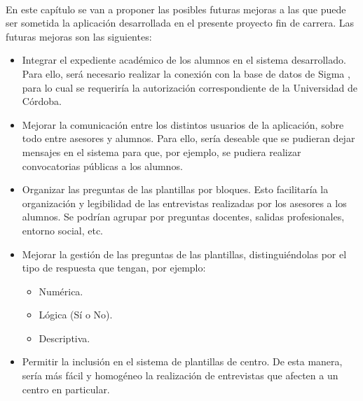 \paragraph{}En este capítulo se van a proponer las posibles futuras mejoras
a las que puede ser sometida la aplicación desarrollada en el presente
proyecto fin de carrera. Las futuras mejoras son las siguientes:

\begin{itemize}
  \item Integrar el expediente académico de los alumnos en el sistema
  desarrollado. Para ello, será necesario realizar la conexión con la base de
  datos de Sigma \cite{sigma}, para lo cual se requeriría la autorización
  correspondiente de la Universidad de Córdoba.
  \item Mejorar la comunicación entre los distintos usuarios de la aplicación,
  sobre todo entre asesores y alumnos. Para ello, sería deseable que se pudieran
  dejar mensajes en el sistema para que, por ejemplo, se pudiera realizar
  convocatorias públicas a los alumnos.
  \item Organizar las preguntas de las plantillas por bloques. Esto facilitaría
  la organización y legibilidad de las entrevistas realizadas por los asesores
  a los alumnos. Se podrían agrupar por preguntas docentes, salidas
  profesionales, entorno social, etc.
  \item Mejorar la gestión de las preguntas de las plantillas, distinguiéndolas
  por el tipo de respuesta que tengan, por ejemplo:
  \begin{itemize}
    \item Numérica.
    \item Lógica (Sí o No).
    \item Descriptiva.
  \end{itemize}
  \item Permitir la inclusión en el sistema de plantillas de centro. De esta
  manera, sería más fácil y homogéneo la realización de entrevistas que afecten
  a un centro en particular.
\end{itemize}


